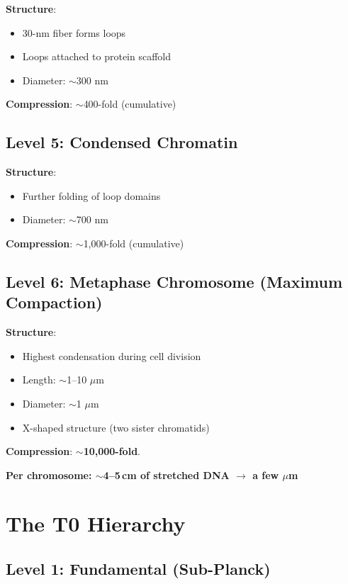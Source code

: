 	\textbf{Structure}:
	\begin{itemize}
		\item 30-nm fiber forms loops
		\item Loops attached to protein scaffold
		\item Diameter: $\sim$300 nm
	\end{itemize}

	\textbf{Compression}: $\sim$400-fold (cumulative)

	\subsection{Level 5: Condensed Chromatin}

	\textbf{Structure}:
	\begin{itemize}
		\item Further folding of loop domains
		\item Diameter: $\sim$700 nm
	\end{itemize}

	\textbf{Compression}: $\sim$1,000-fold (cumulative)

	\subsection{Level 6: Metaphase Chromosome (Maximum Compaction)}

	\textbf{Structure}:
	\begin{itemize}
		\item Highest condensation during cell division
		\item Length: $\sim$1--10 $\mu$m
		\item Diameter: $\sim$1 $\mu$m
		\item X-shaped structure (two sister chromatids)
	\end{itemize}

	\textbf{Compression}: $\sim$\textbf{10,000-fold}.

	\begin{center}
		\textbf{Per chromosome: $\sim$4--5\,cm of stretched DNA $\to$ a few $\mu$m}
	\end{center}

	\section{The T0 Hierarchy}

	\subsection{Level 1: Fundamental (Sub-Planck)}

